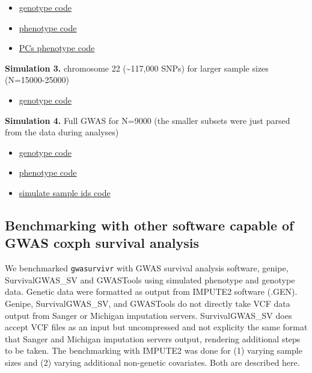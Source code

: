 \documentclass[]{DissertateUSU}
\begin{document}
\begin{itemize}
  \item \href{https://github.com/suchestoncampbelllab/gwasurvivr_manuscript/blob/master/hapgen2/code/generate_chr18_subsets_geno.sh}{genotype code}
  \item \href{https://github.com/suchestoncampbelllab/gwasurvivr_manuscript/blob/master/benchmark_experiments/code/simulate_phenotypes_benchmark.R}{phenotype code}  
  \item \href{https://github.com/suchestoncampbelllab/gwasurvivr_manuscript/blob/master/diff_cov_benchmarks/code/add_pcs_covariates.R}{PCs phenotype code}
\end{itemize}

\textbf{Simulation 3.} chromosome 22 (\textasciitilde{}117,000 SNPs) for
larger sample sizes (N=15000-25000)

\begin{itemize}
  \item \href{https://github.com/suchestoncampbelllab/gwasurvivr_manuscript/blob/master/hapgen2/code/generate_largeN_geno.sh}{genotype code}
\end{itemize}

\textbf{Simulation 4.} Full GWAS for N=9000 (the smaller subsets were
just parsed from the data during analyses)

\begin{itemize}
  \item \href{https://github.com/suchestoncampbelllab/gwasurvivr_manuscript/blob/master/hapgen2/code/generate_gwas_geno.sh}{genotype code}   
  \item \href{https://github.com/suchestoncampbelllab/gwasurvivr_manuscript/blob/master/full_gwas_experiments/code/phenotype_sim.R}{phenotype code}
  \item \href{https://github.com/suchestoncampbelllab/gwasurvivr_manuscript/blob/master/full_gwas_experiments/code/simulate_gwas_sample_ids.R}{simulate sample ids code}  
\end{itemize}

\subsection{Benchmarking with other software capable of GWAS coxph
survival
analysis}\label{benchmarking-with-other-software-capable-of-gwas-coxph-survival-analysis}

We benchmarked \texttt{gwasurvivr} with GWAS survival analysis software,
genipe, SurvivalGWAS\_SV and GWASTools using simulated phenotype and
genotype data. Genetic data were formatted as output from IMPUTE2
software (.GEN). Genipe, SurvivalGWAS\_SV, and GWASTools do not directly
take VCF data output from Sanger or Michigan imputation servers.
SurvivalGWAS\_SV does accept VCF files as an input but uncompressed and
not explicity the same format that Sanger and Michigan imputation
servers output, rendering additional steps to be taken. The benchmarking
with IMPUTE2 was done for (1) varying sample sizes and (2) varying
additional non-genetic covariates. Both are described here.
\end{document}
